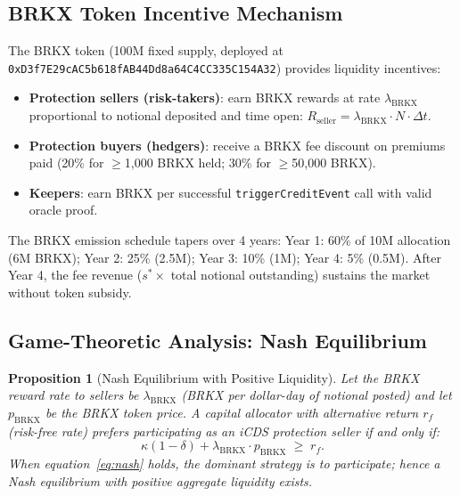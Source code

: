 \documentclass[12pt]{article}
\theoremstyle{plain}
\newtheorem{proposition}{Proposition}[section]
\theoremstyle{definition}
\theoremstyle{remark}
\begin{document}
\subsection{BRKX Token Incentive Mechanism}

The BRKX token (100M fixed supply, deployed at
\texttt{0xD3f7E29cAC5b618fAB44Dd8a64C4CC335C154A32}) provides liquidity
incentives:

\begin{itemize}[noitemsep]
  \item \textbf{Protection sellers (risk-takers)}: earn BRKX rewards at rate
    $\lambda_{\text{BRKX}}$ proportional to notional deposited and time open:
    $R_{\text{seller}} = \lambda_{\text{BRKX}} \cdot N \cdot \Delta t$.
  \item \textbf{Protection buyers (hedgers)}: receive a BRKX fee discount on
    premiums paid (20\% for $\geq$1,000 BRKX held; 30\% for $\geq$50,000 BRKX).
  \item \textbf{Keepers}: earn BRKX per successful \texttt{triggerCreditEvent}
    call with valid oracle proof.
\end{itemize}

The BRKX emission schedule tapers over 4 years:
Year 1: 60\% of 10M allocation (6M BRKX); Year 2: 25\% (2.5M);
Year 3: 10\% (1M); Year 4: 5\% (0.5M).
After Year 4, the fee revenue ($s^* \times$ total notional outstanding)
sustains the market without token subsidy.

\subsection{Game-Theoretic Analysis: Nash Equilibrium}

\begin{proposition}[Nash Equilibrium with Positive Liquidity]
  Let the BRKX reward rate to sellers be $\lambda_{\text{BRKX}}$ (BRKX per
  dollar-day of notional posted) and let $p_{\text{BRKX}}$ be the BRKX token
  price.
  A capital allocator with alternative return $r_f$ (risk-free rate) prefers
  participating as an iCDS protection seller if and only if:
  \begin{equation}
    \kappa(1-\delta) + \lambda_{\text{BRKX}} \cdot p_{\text{BRKX}} \;\geq\; r_f.
    \label{eq:nash}
  \end{equation}
  When equation~\eqref{eq:nash} holds, the dominant strategy is to participate;
  hence a Nash equilibrium with positive aggregate liquidity exists.
\end{proposition}
\end{document}
